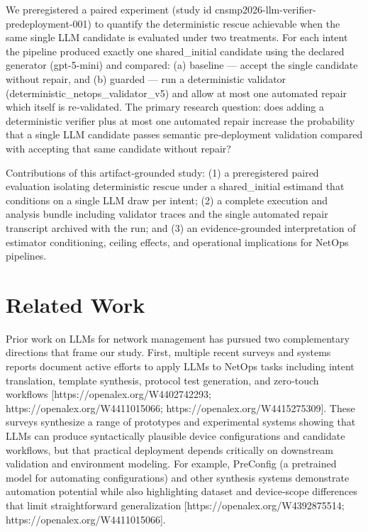 \documentclass[conference]{IEEEtran}
\begin{document}
We preregistered a paired experiment (study id cnsmp2026-llm-verifier-predeployment-001) to quantify the deterministic rescue achievable when the same single LLM candidate is evaluated under two treatments. For each intent the pipeline produced exactly one shared\_initial candidate using the declared generator (gpt-5-mini) and compared: (a) baseline --- accept the single candidate without repair, and (b) guarded --- run a deterministic validator (deterministic\_netops\_validator\_v5) and allow at most one automated repair which itself is re‑validated. The primary research question: does adding a deterministic verifier plus at most one automated repair increase the probability that a single LLM candidate passes semantic pre‑deployment validation compared with accepting that same candidate without repair?

Contributions of this artifact‑grounded study: (1) a preregistered paired evaluation isolating deterministic rescue under a shared\_initial estimand that conditions on a single LLM draw per intent; (2) a complete execution and analysis bundle including validator traces and the single automated repair transcript archived with the run; and (3) an evidence‑grounded interpretation of estimator conditioning, ceiling effects, and operational implications for NetOps pipelines.

\section{Related Work}
Prior work on LLMs for network management has pursued two complementary directions that frame our study. First, multiple recent surveys and systems reports document active efforts to apply LLMs to NetOps tasks including intent translation, template synthesis, protocol test generation, and zero‑touch workflows [https://openalex.org/W4402742293; https://openalex.org/W4411015066; https://openalex.org/W4415275309]. These surveys synthesize a range of prototypes and experimental systems showing that LLMs can produce syntactically plausible device configurations and candidate workflows, but that practical deployment depends critically on downstream validation and environment modeling. For example, PreConfig (a pretrained model for automating configurations) and other synthesis systems demonstrate automation potential while also highlighting dataset and device‑scope differences that limit straightforward generalization [https://openalex.org/W4392875514; https://openalex.org/W4411015066].
\end{document}
